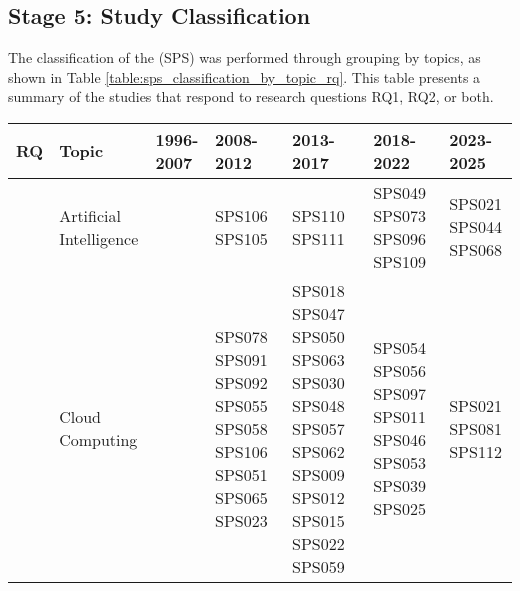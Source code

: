 \subsection{Stage 5: Study Classification}\label{subsec:clasificacion-de-estudios}
The classification of the (SPS) was performed through grouping by topics, as shown in Table \ref{table:sps_classification_by_topic_rq}. This table presents a summary of the studies that respond to research questions RQ1, RQ2, or both.

\begin{table}
	{\fontsize{7}{9}\selectfont
		\renewcommand{\arraystretch}{1.2}
		\setlength{\tabcolsep}{3pt}
		\begin{tabular}{>{\raggedright\arraybackslash}p{0.9cm}>{\raggedright\arraybackslash}p{2.0cm}>{\raggedright\arraybackslash}p{2.5cm}>{\raggedright\arraybackslash}p{3.0cm}>{\raggedright\arraybackslash}p{3.2cm}>{\raggedright\arraybackslash}p{2.3cm}>{\raggedright\arraybackslash}p{2.3cm}}\toprule
			\textbf{RQ}                    & \textbf{Topic}          & \textbf{1996-2007}                                      & \textbf{2008-2012}                                                                                                            & \textbf{2013-2017}                                                                         & \textbf{2018-2022}                                                                  & \textbf{2023-2025}                 \\
			\midrule
			\multirow{12}{*}{\textbf{RQ1}} & Artificial Intelligence &                                                         & SPS106 SPS105                                                                                                                 & SPS110 SPS111                                                                              & SPS049 SPS073 SPS096 SPS109                                                         & SPS021 SPS044 SPS068               \\[3.0em]
			                               & Cloud Computing         &                                                         & SPS078 SPS091 SPS092 SPS055 SPS058 SPS106 SPS051 SPS065 SPS023                                                                & SPS018 SPS047 SPS050 SPS063 SPS030 SPS048 SPS057 SPS062 SPS009 SPS012 SPS015 SPS022 SPS059 & SPS054 SPS056 SPS097 SPS011 SPS046 SPS053 SPS039 SPS025                             & SPS021 SPS081 SPS112               \\[3.0em]

\end{tabular}}
\end{table}
